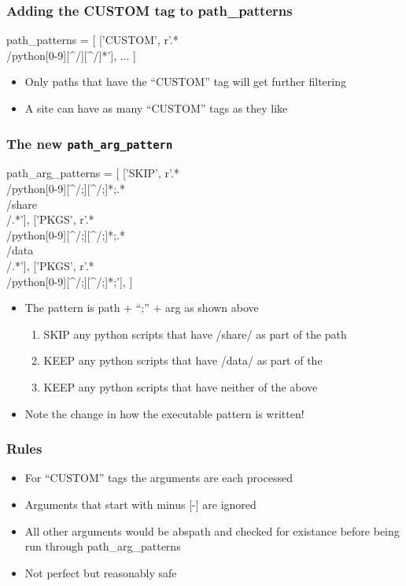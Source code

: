 \documentclass{beamer}
\begin{document}
\begin{frame}[fragile]
    \frametitle{Adding the CUSTOM tag to path\_patterns}
 {\tiny
    \begin{semiverbatim}
path_patterns = [
    ['CUSTOM',  r'.*\\/python[0-9][^/][^/]*'],
    ...
]
    \end{semiverbatim}
}
  \begin{itemize}
    \item Only paths that have the ``CUSTOM'' tag will get further filtering
    \item A site can have as many ``CUSTOM'' tags as they like
  \end{itemize}

\end{frame}

\begin{frame}[fragile]
    \frametitle{The new \texttt{path\_arg\_pattern}}
 {\tiny
    \begin{semiverbatim}
path_arg_patterns = [
  ['SKIP', r'.*\\/python[0-9][^/;][^/;]*;.*\\/share\\/.*'],
  ['PKGS', r'.*\\/python[0-9][^/;][^/;]*;.*\\/data\\/.*'],
  ['PKGS', r'.*\\/python[0-9][^/;][^/;]*;'],
]
    \end{semiverbatim}
}
  \begin{itemize}
    \item The pattern is path + ``;'' + arg as shown above
      \begin{enumerate}
        \item SKIP any python scripts that have /share/ as part of the
          path
        \item KEEP any python scripts that have /data/ as part of the
        \item KEEP any python scripts that have neither of the above
      \end{enumerate}
    \item Note the change in how the executable pattern is written!
  \end{itemize}

\end{frame}

\begin{frame}[fragile]
    \frametitle{Rules}
 {\tiny
    \begin{semiverbatim}
    \end{semiverbatim}
}
  \begin{itemize}
    \item For ``CUSTOM'' tags the arguments are each processed
    \item Arguments that start with minus [-] are ignored
    \item All other arguments would be abspath and checked for existance
      before being run through path\_arg\_patterns
    \item Not perfect but reasonably safe
  \end{itemize}
\end{frame}
\end{document}
